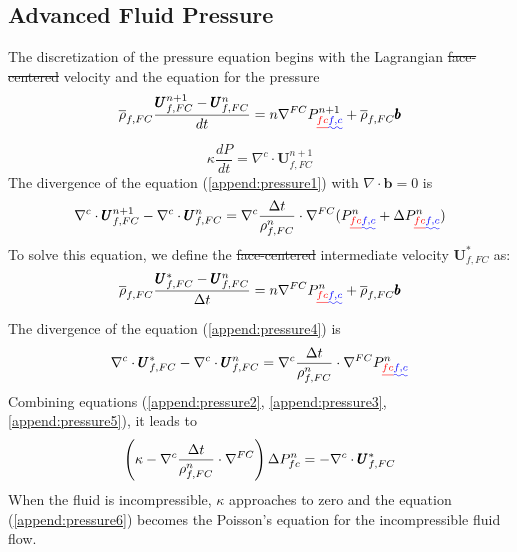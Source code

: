 \documentclass[preprint,12pt]{elsarticle}
\providecommand{\DIFadd}[1]{{\protect\color{blue}\uwave{#1}}} %
\providecommand{\DIFdel}[1]{{\protect\color{red}\sout{#1}}}                      %
\providecommand{\DIFaddbegin}{} %
\providecommand{\DIFaddend}{} %
\providecommand{\DIFdelbegin}{} %
\providecommand{\DIFdelend}{} %
\newcommand{\DIFscaledelfig}{0.5}
\newlength{\DIFdelgraphicswidth} %
\newlength{\DIFdelgraphicsheight} %
\newcommand{\DIFaddincludegraphics}[2][]{{\color{blue}\fbox{\DIFOincludegraphics[#1]{#2}}}} %
\newcommand{\DIFdelincludegraphics}[2][]{%
\sbox{\DIFdelgraphicsbox}{\DIFOincludegraphics[#1]{#2}}%
\settoboxwidth{\DIFdelgraphicswidth}{\DIFdelgraphicsbox} %
\settoboxtotalheight{\DIFdelgraphicsheight}{\DIFdelgraphicsbox} %
\scalebox{\DIFscaledelfig}{%
\parbox[b]{\DIFdelgraphicswidth}{\usebox{\DIFdelgraphicsbox}\\[-\baselineskip] \rule{\DIFdelgraphicswidth}{0em}}\llap{\resizebox{\DIFdelgraphicswidth}{\DIFdelgraphicsheight}{%
\setlength{\unitlength}{\DIFdelgraphicswidth}%
\begin{picture}(1,1)%
\thicklines\linethickness{2pt} %
{\color[rgb]{1,0,0}\put(0,0){\framebox(1,1){}}}%
{\color[rgb]{1,0,0}\put(0,0){\line( 1,1){1}}}%
{\color[rgb]{1,0,0}\put(0,1){\line(1,-1){1}}}%
\end{picture}%
}\hspace*{3pt}}} %
} %
\DeclareRobustCommand{\DIFaddbegin}{\DIFOaddbegin \let\includegraphics\DIFaddincludegraphics} %
\DeclareRobustCommand{\DIFaddend}{\DIFOaddend \let\includegraphics\DIFOincludegraphics} %
\DeclareRobustCommand{\DIFdelbegin}{\DIFOdelbegin \let\includegraphics\DIFdelincludegraphics} %
\DeclareRobustCommand{\DIFdelend}{\DIFOaddend \let\includegraphics\DIFOincludegraphics} %
\begin{document}
\subsection{\textsf{Advanced Fluid Pressure}}
The discretization of the pressure equation begins with the Lagrangian \DIFdelbegin \DIFdel{face-centered }\DIFdelend \DIFaddbegin \DIFadd{cell face }\DIFaddend velocity and the equation for the pressure \DIFaddbegin \DIFadd{as:
}\DIFaddend %
\begin{equation}
 \label{append:pressure1}
  \overline{\rho}_{f,FC} \frac{\pmb{U}_{f,FC}^{n+1} - \pmb{U}_{f,FC}^{n}}{dt} 
  = n \nabla^{FC} P_{\DIFdelbegin \DIFdel{fc}\DIFdelend \DIFaddbegin \DIFadd{f,c}\DIFaddend }^{n+1} + \overline{\rho}_{f,FC} \pmb{b}
\end {equation}
%
%
\begin{equation}
\label{append:pressure2}
  \kappa \frac{dP}{dt} = \nabla^c \cdot \pmb{U}_{f,FC}^{n+1}
\end {equation}
%
The divergence of the equation (\ref{append:pressure1}) with $ \nabla \cdot \pmb{b} = 0$ is\DIFaddbegin \DIFadd{:
}\DIFaddend %
\begin{equation}
\label{append:pressure3}
  \nabla^c \cdot \pmb{U}_{f,FC}^{n+1} - \nabla^c \cdot \pmb{U}_{f,FC}^{n}
  = \nabla^c \frac{\delt}{\rho_{f,FC}^n} \cdot \nabla^{FC} (P_{\DIFdelbegin \DIFdel{fc}\DIFdelend \DIFaddbegin \DIFadd{f,c}\DIFaddend }^{n} + \Delta P_{\DIFdelbegin \DIFdel{fc}\DIFdelend \DIFaddbegin \DIFadd{f,c}\DIFaddend }^{n})
\end {equation}
%
To solve this equation, we define the \DIFdelbegin \DIFdel{face-centered }\DIFdelend \DIFaddbegin \DIFadd{cell face }\DIFaddend intermediate velocity $ \pmb{U}_{f,FC}^{*}$ as:
%
\begin{equation}
 \label{append:pressure4}
  \overline{\rho}_{f,FC} \frac{\pmb{U}_{f,FC}^{*} - \pmb{U}_{f,FC}^{n}}{\delt} 
  = n \nabla^{FC} P_{\DIFdelbegin \DIFdel{fc}\DIFdelend \DIFaddbegin \DIFadd{f,c}\DIFaddend }^{n} + \overline{\rho}_{f,FC} \pmb{b}
\end {equation}
%
%
The divergence of the equation (\ref{append:pressure4}) is\DIFaddbegin \DIFadd{:
}\DIFaddend %
\begin{equation}
\label{append:pressure5}
  \nabla^c \cdot \pmb{U}_{f,FC}^{*} - \nabla^c \cdot \pmb{U}_{f,FC}^{n}
  = \nabla^c \frac{\delt}{\rho_{f,FC}^n} \cdot \nabla^{FC} P_{\DIFdelbegin \DIFdel{fc}\DIFdelend \DIFaddbegin \DIFadd{f,c}\DIFaddend }^{n}
\end {equation}
%
Combining equations (\ref{append:pressure2}, \ref{append:pressure3}, \ref{append:pressure5}), it leads to\DIFaddbegin \DIFadd{:
}\DIFaddend \begin{equation}
\label{append:pressure6}
  \left(  
   \kappa - \nabla^c \frac{\Delta{t}}{\rho_{f,FC}^n} \cdot \nabla^{FC}
  \right) \Delta P_{fc}^{n} = - \nabla^c \cdot \pmb{U}_{f,FC}^{*}
\end {equation}
When the fluid is incompressible, $\kappa$ approaches to zero and the equation (\ref{append:pressure6}) becomes the Poisson's equation for the incompressible fluid flow.
%
%
\end{document}

